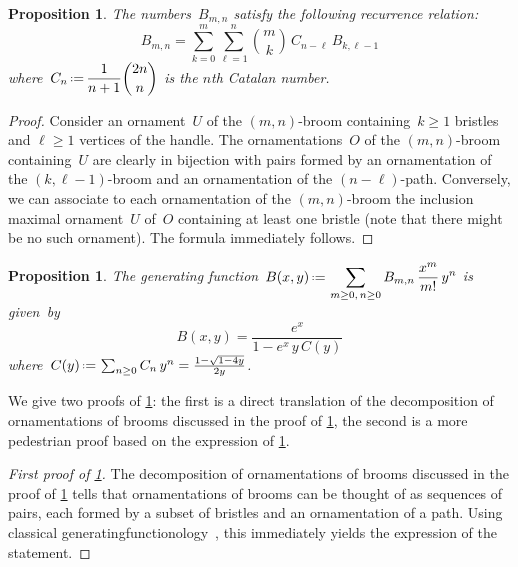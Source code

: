 \documentclass{amsart}
\newtheorem{proposition}[theorem]{Proposition}
\theoremstyle{definition}
\newcommand{\eqdef}{\mbox{\,\raisebox{0.2ex}{\scriptsize\ensuremath{\mathrm:}}\ensuremath{=}\,}} %
\begin{document}
\begin{proposition}
\label{prop:brooms1}
The numbers~$B_{m,n}$ satisfy the following recurrence relation:
\[
B_{m,n} = \sum_{k = 0}^m \sum_{\ell = 1}^n \binom{m}{k} \, C_{n-\ell} \, B_{k,\ell-1}
\]
where~$\displaystyle C_n \eqdef \frac{1}{n+1}\binom{2n}{n}$ is the $n$th Catalan number.
\end{proposition}

\begin{proof}
Consider an ornament~$U$ of the $(m,n)$-broom containing~$k \ge 1$ bristles and $\ell \ge 1$ vertices of the handle.
The ornamentations~$O$ of the $(m,n)$-broom containing~$U$ are clearly in bijection with pairs formed by an ornamentation of the $(k, \ell-1)$-broom and an ornamentation of the $(n-\ell)$-path.
Conversely, we can associate to each ornamentation of the $(m,n)$-broom the inclusion maximal ornament~$U$ of~$O$ containing at least one bristle (note that there might be no such ornament).
The formula immediately follows.
\end{proof}

\begin{proposition}
\label{prop:brooms2}
The generating function~$\displaystyle B(x,y) \eqdef \sum_{m \ge 0, \, n \ge 0} B_{m,n} \, \frac{x^m}{m!} \, y^n$ is given~by
\[
B(x,y) = \frac{e^x}{1-e^x \, y \, C(y)}
\]
where~$C(y) \eqdef \sum_{n \ge 0} C_n \, y^n = \frac{1-\sqrt{1-4y}}{2y}$.
\end{proposition}

We give two proofs of \cref{prop:brooms2}: the first is a direct translation of the decomposition of ornamentations of brooms discussed in the proof of \cref{prop:brooms1}, the second is a more pedestrian proof based on the expression of \cref{prop:brooms1}.

\begin{proof}[First proof of \cref{prop:brooms2}]
The decomposition of ornamentations of brooms discussed in the proof of \cref{prop:brooms1} tells that ornamentations of brooms can be thought of as sequences of pairs, each formed by a subset of bristles and an ornamentation of a path.
Using classical generatingfunctionology~\cite{FlajoletSedgewick}, this immediately yields the expression of the statement.
\end{proof}
\end{document}
